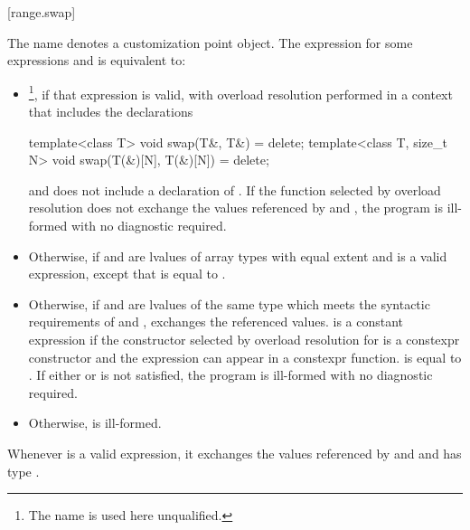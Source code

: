 {\color{addclr}
\setcounter{section}{2}
\setcounter{subsection}{2}
[range.swap]{}

%
\pnum The name  denotes a customization point
object. The  expression
 for some expressions 
and  is equivalent to:

\begin{itemize}
\item
  \footnote{The name  is used here unqualified.}, if that expression is valid, with overload resolution
  performed in a context that includes the declarations
\begin{codeblock}
  template<class T>
  void swap(T&, T&) = delete;
  template<class T, size_t N>
  void swap(T(&)[N], T(&)[N]) = delete;
\end{codeblock}
  and does not include a declaration of .
  If the function selected by overload resolution does not
  exchange the values referenced by  and ,
  the program is ill-formed with no diagnostic required.

\item
  Otherwise,  if  and
   are lvalues of array types
  with equal extent and 
  is a valid expression, except that
   is equal to
  .

\item
  Otherwise, if  and  are lvalues of the
  same type  which meets the syntactic requirements of
   and
  , exchanges the referenced values.
   is a constant expression if
  the constructor selected by overload resolution for
   is a constexpr constructor and
  the expression  can appear in a
  constexpr function. 
  is equal to . If either
   or
   is not satisfied, the program
  is ill-formed with no diagnostic required.

\item
  Otherwise,  is ill-formed.
\end{itemize}

\pnum
\oldtxt{\remarks}
\begin{note}
Whenever  is a valid
expression, it exchanges the values referenced by 
and  and has type .
\end{note}
} %

